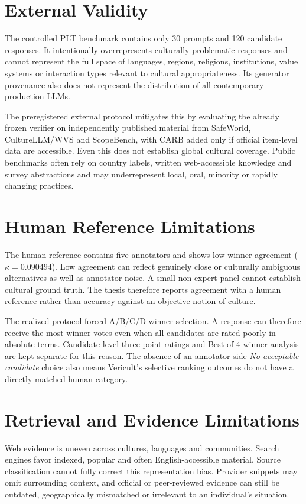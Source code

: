 \section{External Validity}

The controlled PLT benchmark contains only 30 prompts and 120 candidate responses. It intentionally overrepresents culturally problematic responses and cannot represent the full space of languages, regions, religions, institutions, value systems or interaction types relevant to cultural appropriateness. Its generator provenance also does not represent the distribution of all contemporary production LLMs.

The preregistered external protocol mitigates this by evaluating the already frozen verifier on independently published material from SafeWorld, CultureLLM/WVS and ScopeBench, with CARB added only if official item-level data are accessible. Even this does not establish global cultural coverage. Public benchmarks often rely on country labels, written web-accessible knowledge and survey abstractions and may underrepresent local, oral, minority or rapidly changing practices.

\section{Human Reference Limitations}

The human reference contains five annotators and shows low winner agreement ($\kappa=0.090494$). Low agreement can reflect genuinely close or culturally ambiguous alternatives as well as annotator noise. A small non-expert panel cannot establish cultural ground truth. The thesis therefore reports agreement with a human reference rather than accuracy against an objective notion of culture.

The realized protocol forced A/B/C/D winner selection. A response can therefore receive the most winner votes even when all candidates are rated poorly in absolute terms. Candidate-level three-point ratings and Best-of-4 winner analysis are kept separate for this reason. The absence of an annotator-side \emph{No acceptable candidate} choice also means Vericult's selective ranking outcomes do not have a directly matched human category.

\section{Retrieval and Evidence Limitations}

Web evidence is uneven across cultures, languages and communities. Search engines favor indexed, popular and often English-accessible material. Source classification cannot fully correct this representation bias. Provider snippets may omit surrounding context, and official or peer-reviewed evidence can still be outdated, geographically mismatched or irrelevant to an individual's situation.

